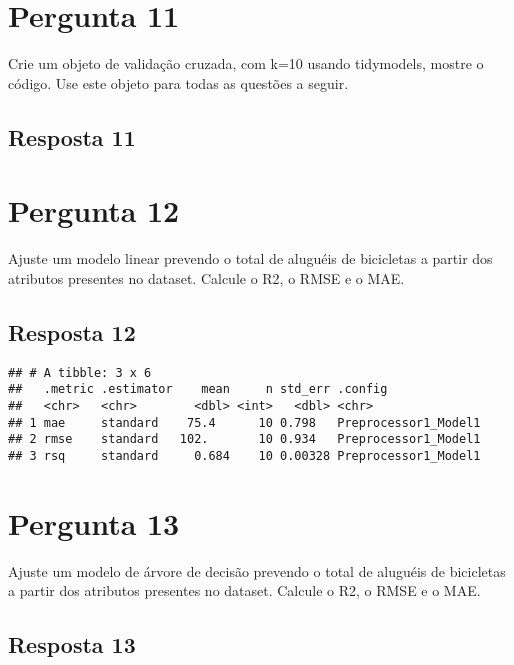\documentclass[
]{article}
\begin{document}
\hypertarget{pergunta-11}{%
\section{Pergunta 11}\label{pergunta-11}}

Crie um objeto de validação cruzada, com k=10 usando tidymodels, mostre
o código. Use este objeto para todas as questões a seguir.

\hypertarget{resposta-11}{%
\subsection{Resposta 11}\label{resposta-11}}

\hypertarget{pergunta-12}{%
\section{Pergunta 12}\label{pergunta-12}}

Ajuste um modelo linear prevendo o total de aluguéis de bicicletas a
partir dos atributos presentes no dataset. Calcule o R2, o RMSE e o MAE.

\hypertarget{resposta-12}{%
\subsection{Resposta 12}\label{resposta-12}}

\begin{verbatim}
## # A tibble: 3 x 6
##   .metric .estimator    mean     n std_err .config             
##   <chr>   <chr>        <dbl> <int>   <dbl> <chr>               
## 1 mae     standard    75.4      10 0.798   Preprocessor1_Model1
## 2 rmse    standard   102.       10 0.934   Preprocessor1_Model1
## 3 rsq     standard     0.684    10 0.00328 Preprocessor1_Model1
\end{verbatim}

\hypertarget{pergunta-13}{%
\section{Pergunta 13}\label{pergunta-13}}

Ajuste um modelo de árvore de decisão prevendo o total de aluguéis de
bicicletas a partir dos atributos presentes no dataset. Calcule o R2, o
RMSE e o MAE.

\hypertarget{resposta-13}{%
\subsection{Resposta 13}\label{resposta-13}}
\end{document}
